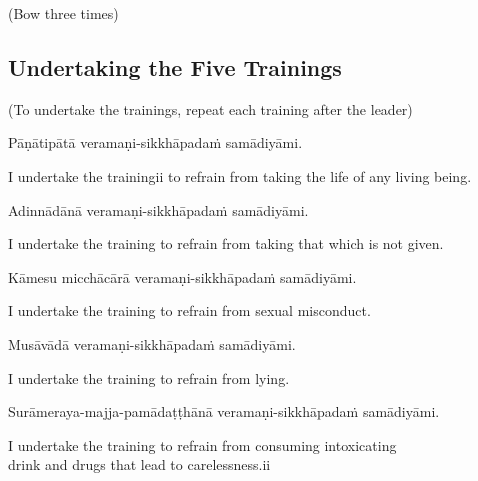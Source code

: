 \begin{center}
(Bow three times)\\
\end{center}

\subsection*{Undertaking the Five Trainings}

\begin{center}
(To undertake the trainings, repeat each training after the leader)\\
\end{center}

Pāṇātipātā veramaṇi-sikkhāpadaṁ samādiyāmi.\\

\begin{english}
I undertake the trainingii to refrain from taking the life of any living being.\\
\end{english}

Adinnādānā veramaṇi-sikkhāpadaṁ samādiyāmi.\\

\begin{english}
I undertake the training to refrain from taking that which is not given.\\
\end{english}

Kāmesu micchācārā veramaṇi-sikkhāpadaṁ samādiyāmi.\\

\begin{english}
I undertake the training to refrain from sexual misconduct.\\
\end{english}

Musāvādā veramaṇi-sikkhāpadaṁ samādiyāmi.\\

\begin{english}
I undertake the training to refrain from lying.\\
\end{english}

Surāmeraya-majja-pamādaṭṭhānā veramaṇi-sikkhāpadaṁ samādiyāmi.\\

\begin{english}
I undertake the training to refrain from consuming intoxicating\\
drink and drugs that lead to carelessness.ii\\
\end{english}

